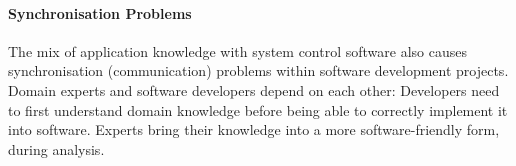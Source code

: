 %
%
%
%
%
%
%

\paragraph{Synchronisation Problems}
\label{synchronisation_problems_heading}

The mix of application knowledge with system control software also causes
synchronisation (communication) problems within software development projects.
Domain experts and software developers depend on each other: Developers need to
first understand domain knowledge before being able to correctly implement it
into software. Experts bring their knowledge into a more software-friendly
form, during analysis.
